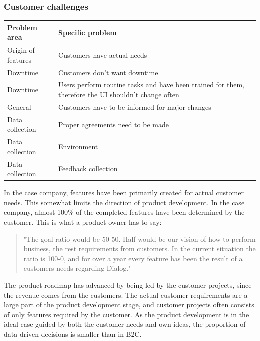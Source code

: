 \documentclass[english]{tktltiki2}
\theoremstyle{definition}
\theoremstyle{remark}
\begin{document}
\subsubsection{Customer challenges}

\begin{center}
    \begin{tabular}{ | l | p{5cm} |}
    \hline
    Problem area & Specific problem \\ \hline
    Origin of features & Customers have actual needs \\ \hline
	Downtime & Customers don't want downtime \\ \hline
	Downtime & Users perform routine tasks and have been trained for them, therefore the UI shouldn't change often \\ \hline
	General & Customers have to be informed for major changes \\ \hline
	Data collection & Proper agreements need to be made \\ \hline
	Data collection & Environment \\ \hline
	Data collection & Feedback collection
    \hline
    \end{tabular}
\end{center}

In the case company, features have been primarily created for actual customer needs. This somewhat limits the direction of product development. In the case company, almost 100\% of the completed features have been determined by the customer. This is what a product owner has to say:

\begin{quote}
"The goal ratio would be 50-50. Half would be our vision of how to perform business, the rest requirements from customers. In the current situation the ratio is 100-0, and for over a year every feature has been the result of a customers needs regarding Dialog."
\end{quote}

The product roadmap has advanced by being led by the customer projects, since the revenue comes from the customers. The actual customer requirements are a large part of the product development stage, and customer projects often consists of only features required by the customer. As the product development is in the ideal case guided by both the customer needs and own ideas, the proportion of data-driven decisions is smaller than in B2C.

\end{document}
